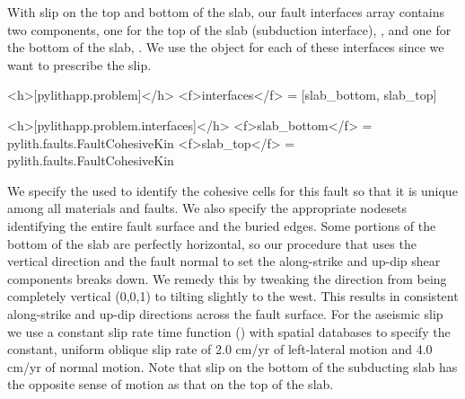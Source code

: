 With slip on the top and bottom of the slab, our fault interfaces
array contains two components, one for the top of the slab (subduction
interface), , and one for the bottom of the slab,
. We use the  object
for each of these interfaces since we want to prescribe the slip.
\begin{cfg}
<h>[pylithapp.problem]</h>
<f>interfaces</f> = [slab_bottom, slab_top]

<h>[pylithapp.problem.interfaces]</h>
<f>slab_bottom</f> = pylith.faults.FaultCohesiveKin
<f>slab_top</f> = pylith.faults.FaultCohesiveKin
\end{cfg}

We specify the  used to identify the cohesive cells for
this fault so that it is unique among all materials and faults. We
also specify the appropriate nodesets identifying the entire fault
surface and the buried edges.  Some portions of the bottom of the slab
are perfectly horizontal, so our procedure that uses the vertical
direction and the fault normal to set the along-strike and up-dip
shear components breaks down. We remedy this by tweaking the
 direction from being completely vertical (0,0,1) to
tilting slightly to the west. This results in consistent along-strike
and up-dip directions across the fault surface. For the aseismic slip
we use a constant slip rate time function ()
with  spatial databases to specify the constant,
uniform oblique slip rate of 2.0 cm/yr of left-lateral motion and 4.0
cm/yr of normal motion. Note that slip on the bottom of the subducting
slab has the opposite sense of motion as that on the top of the slab.
